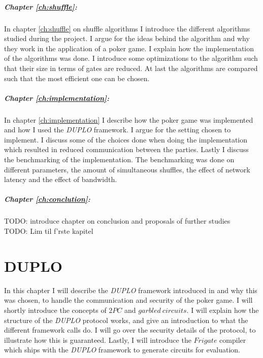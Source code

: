 \documentclass[twoside,11pt,openright]{report}
\newcommand{\todo}[1]{}
\renewcommand{\todo}[1]{{\color{red} TODO: {#1}} \\}
\newcommand{\DUPLO}{\textit{DUPLO} }
\begin{document}
\paragraph{Chapter \ref{ch:shuffle}:}
In chapter \ref{ch:shuffle} on shuffle algorithms I introduce the different algorithms studied during the project. I argue for the ideas behind the algorithm and why they work in the application of a poker game. I explain how the implementation of the algorithms was done. I introduce some optimizations to the algorithm such that their size in terms of gates are reduced. At last the algorithms are compared such that the most efficient one can be chosen.

\paragraph{Chapter \ref{ch:implementation}:}
In chapter \ref{ch:implementation} I describe how the poker game was implemented and how I used the \DUPLO framework. I argue for the setting chosen to implement. I discuss some of the choices done when doing the implementation which resulted in reduced communication between the parties. Lastly I discuss the benchmarking of the implementation. The benchmarking was done on different parameters, the amount of simultaneous shuffles, the effect of network latency and the effect of bandwidth. 

\paragraph{Chapter \ref{ch:conclution}:}
\todo{introduce chapter on conclusion and proposals of further studies}


\todo{Lim til f'rste kapitel}

\chapter{DUPLO}
\label{ch:duplo}

In this chapter I will describe the \DUPLO framework introduced in \cite{duplo} and why this was chosen, to handle the communication and security of the poker game. I will shortly introduce the concepts of $2PC$ and $garbled~circuits$. I will explain how the structure of the \DUPLO protocol works, and give an introduction to what the different framework calls do. I will go over the security details of the protocol, to illustrate how this is guaranteed. Lastly, I will introduce the $Frigate$ compiler which ships with the \DUPLO framework to generate circuits for evaluation.
\end{document}
